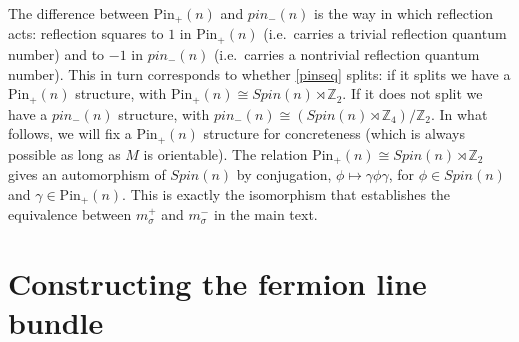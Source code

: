 \documentclass[12pt,a4paper]{article}
\newcommand{\zz}{\mathbb{Z}}
\newcommand{\zt}{\mathbb{Z}_2}
\newcommand\be            {\begin{equation}}
\newcommand\ee            {\end{equation}}
\newcommand{\spin}{\text{Spin}}
\newcommand{\pin}{\text{Pin}}	%
\newcommand{\ethan}[1]{{\color{amethyst}\footnotesize{(EL) #1}}}
\begin{document}
The difference between $\pin_+(n)$ and $pin_-(n)$ is the way in which reflection acts: 
reflection squares to $1$ in $\pin_+(n)$ (i.e.\ carries a trivial reflection quantum number) 
and to $-1$ in $pin_-(n)$ (i.e.\ carries a nontrivial reflection quantum number). 
This in turn corresponds to whether \eqref{pinseq} splits: if it splits we have a $\pin_+(n)$ structure, 
with $\pin_+(n) \cong Spin(n) \rtimes \zt$. If it does not split we have a $pin_-(n)$ structure, 
with $pin_-(n) \cong (Spin(n) \rtimes \zz_4)/\zt$. In what follows, we will fix a $\pin_+(n)$ 
structure for concreteness (which is always possible as long as $M$ is orientable). 
The relation $\pin_+(n) \cong Spin(n) \rtimes \zt$ gives an automorphism of $Spin(n)$ by 
conjugation, $\phi \mapsto \gamma \phi \gamma$, for $\phi \in Spin(n)$ and $\gamma \in \pin_+(n)$. 
This is exactly the isomorphism that establishes the equivalence between $m_\sigma^+$ 
and $m_\sigma^-$ in the main text. 






\section{Constructing the fermion line bundle}
\label{fermion_line_bundle} \label{flb_appendix}
\end{document}
